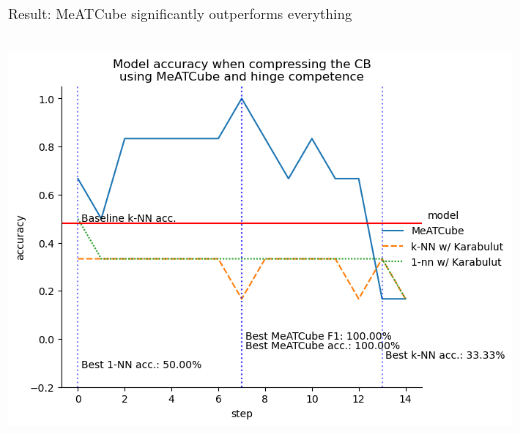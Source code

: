 \documentclass[]{beamer}
\begin{document}
\begin{frame}{Result: MeATCube significantly outperforms everything}
\begin{columns}
\begin{column}{.65\textwidth}
            \includegraphics[width=.8\textwidth]{../results-weight-estim+/figs/lung+cancer.png}
        \end{column}
    \end{columns}
\end{frame}
\end{document}
